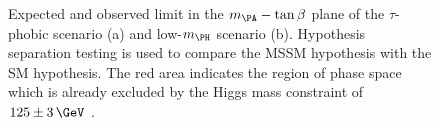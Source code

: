 \begin{figure}[tbh]
\caption[Expected and observed limit in the $m_{\PA}-\tan\beta$ plane of the
$\tau$-phobic scenario (a) and low-$m_{\PH}$ scenario (b).]
{Expected and observed limit in the $m_{\PA}-\tan\beta$ plane of the
$\tau$-phobic scenario (a) and low-$m_{\PH}$ scenario (b). Hypothesis
separation testing is used to compare the \ac{MSSM} hypothesis with the SM
hypothesis. The red area indicates the region of phase space which is already
excluded by the Higgs mass constraint of $125\pm3\,\GeV$ \cite{HIG-13-021}.}
\label{fig:tauphobiclowmH}
\end{figure}
